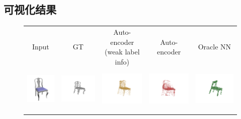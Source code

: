 \documentclass[bachelor, nocolorlinks, printoneside]{seuthesis} %
\begin{document}
\begin{Appendix}{}
    \chapter{可视化结果}
    \begin{figure}[!h]
        \centering
            \begin{tabular}{c@{}c@{}c@{}c@{}c@{}}
            Input & GT & \makecell[c]{Auto-encoder \\(weak label info)} & Auto-encoder & Oracle NN\\
            \includegraphics[width=0.11\columnwidth,height=1.8cm]{figs/supp_real_dataset/Image/chair_fb8b45151900e6e016a0c57b9ceb6d01.png} &
            \includegraphics[width=0.22\columnwidth,height=2cm]{figs/supp_real_dataset/GT/chair_fb8b45151900e6e016a0c57b9ceb6d01_gt.png} &
            \includegraphics[width=0.22\columnwidth,height=2cm]{figs/supp_real_dataset/AE_label/chair_fb8b45151900e6e016a0c57b9ceb6d01_label.png} &
            \includegraphics[width=0.22\columnwidth,height=2cm]{figs/supp_real_dataset/AE/chair_fb8b45151900e6e016a0c57b9ceb6d01_pred.png} &
            \includegraphics[width=0.22\columnwidth,height=2cm]{figs/supp_real_dataset/oracle/chair_fb8b45151900e6e016a0c57b9ceb6d01_oracle.png} \\
            \vspace{-5mm}

\end{tabular}
\end{figure}
\end{Appendix}
\end{document}

